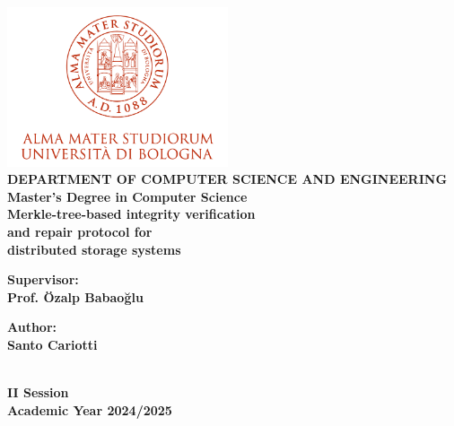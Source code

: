 
\begin{titlepage}
\begin{center}


\includegraphics[width=2.56in]{assets/logo.png}\\[1cm]

{\bfseries DEPARTMENT OF COMPUTER SCIENCE AND ENGINEERING \\ 
Master's Degree in Computer Science } \\[5cm]


{\LARGE \bfseries
Merkle-tree-based integrity verification\\ and repair protocol for\\ distributed storage systems\\[7cm]
}

\begin{minipage}[t]{0.47\textwidth}
\raggedright
{\large \bfseries Supervisor: \\ Prof. Özalp Babaoğlu}
\end{minipage}
\hfill
\begin{minipage}[t]{0.47\textwidth}
\raggedleft
{\large \bfseries Author: \\ Santo Cariotti}
\end{minipage} \\[3cm]

{\large \bfseries II Session \\ 
Academic Year 2024/2025}

\end{center}
\end{titlepage}

\restoregeometry